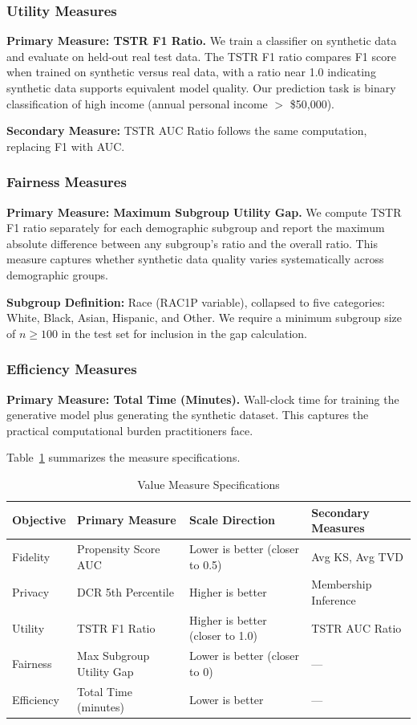 \documentclass[12pt,a4paper]{article}
\begin{document}
\subsubsection{Utility Measures}

\textbf{Primary Measure: TSTR F1 Ratio.} We train a classifier on synthetic data and evaluate on held-out real test data. The TSTR F1 ratio compares F1 score when trained on synthetic versus real data, with a ratio near 1.0 indicating synthetic data supports equivalent model quality. Our prediction task is binary classification of high income (annual personal income $>$ \$50,000).

\textbf{Secondary Measure:} TSTR AUC Ratio follows the same computation, replacing F1 with AUC.

\subsubsection{Fairness Measures}

\textbf{Primary Measure: Maximum Subgroup Utility Gap.} We compute TSTR F1 ratio separately for each demographic subgroup and report the maximum absolute difference between any subgroup's ratio and the overall ratio. This measure captures whether synthetic data quality varies systematically across demographic groups.

\textbf{Subgroup Definition:} Race (RAC1P variable), collapsed to five categories: White, Black, Asian, Hispanic, and Other. We require a minimum subgroup size of $n \geq 100$ in the test set for inclusion in the gap calculation.

\subsubsection{Efficiency Measures}

\textbf{Primary Measure: Total Time (Minutes).} Wall-clock time for training the generative model plus generating the synthetic dataset. This captures the practical computational burden practitioners face.

Table~\ref{tab:measures} summarizes the measure specifications.

\begin{table}[htbp]
\centering
\caption{Value Measure Specifications}
\label{tab:measures}
\begin{tabular}{@{}llll@{}}
\toprule
\textbf{Objective} & \textbf{Primary Measure} & \textbf{Scale Direction} & \textbf{Secondary Measures} \\
\midrule
Fidelity & Propensity Score AUC & Lower is better (closer to 0.5) & Avg KS, Avg TVD \\
Privacy & DCR 5th Percentile & Higher is better & Membership Inference \\
Utility & TSTR F1 Ratio & Higher is better (closer to 1.0) & TSTR AUC Ratio \\
Fairness & Max Subgroup Utility Gap & Lower is better (closer to 0) & --- \\
Efficiency & Total Time (minutes) & Lower is better & --- \\
\bottomrule
\end{tabular}
\end{table}
\end{document}

